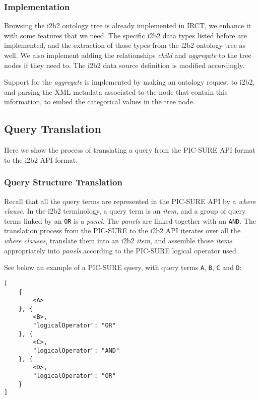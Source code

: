 
\subsubsection{Implementation}

Browsing the i2b2 ontology tree is already implemented in IRCT, we enhance it with some features that we need.
The specific i2b2 data types listed before are implemented, and the extraction of those types from the i2b2 ontology tree as well.
We also implement adding the relationships \emph{child} and \emph{aggregate} to the tree nodes if they need to.
The i2b2 data source definition is modified accordingly.

Support for the \emph{aggregate} is implemented by making an ontology request to i2b2, and parsing the XML metadata associated to the node that contain this information, to embed the categorical values in the tree node.


\subsection{Query Translation}
\label{sec:interop-layer-query-translation}

Here we show the process of translating a query from the PIC-SURE API format to the i2b2 API format.

\subsubsection{Query Structure Translation}

Recall that all the query terms are represented in the PIC-SURE API by a \emph{where clause}.
In the i2b2 terminology, a query term is an \emph{item}, and a group of query terms linked by an \verb|OR| is a \emph{panel}.
The \emph{panels} are linked together with an \verb|AND|.
The translation process from the PIC-SURE to the i2b2 API iterates over all the \emph{where clauses}, translate them into an i2b2 \emph{item}, and assemble those \emph{items} appropriately into \emph{panels} according to the PIC-SURE logical operator used.

\begin{samepage}
See below an example of a PIC-SURE query, with query terms \verb|A|, \verb|B|, \verb|C| and \verb|D|:
\begin{verbatim}
[
    { 
        <A>
    }, {
        <B>,
        "logicalOperator": "OR"
    }, {
        <C>,
        "logicalOperator": "AND"
    }, {
        <D>,
        "logicalOperator": "OR"
    }
]
\end{verbatim}
\end{samepage}

